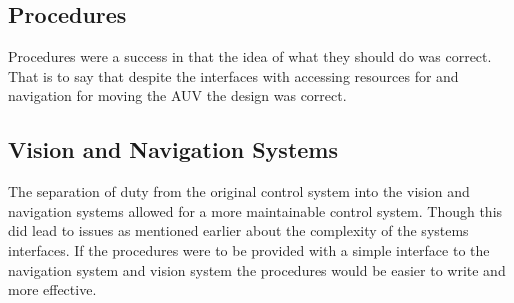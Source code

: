 \subsection{Procedures}

Procedures were a success in that the idea of what they should do was correct.
That is to say that despite the interfaces with accessing resources for and
navigation for moving the AUV the design was correct.

\subsection{Vision and Navigation Systems}

The separation of duty from the original control system into the vision and
navigation systems allowed for a more maintainable control system.
Though this did lead to issues as mentioned earlier about the complexity of
the systems interfaces.
If the procedures were to be provided with a simple interface to the navigation
system and vision system the procedures would be easier to write and more
effective.
